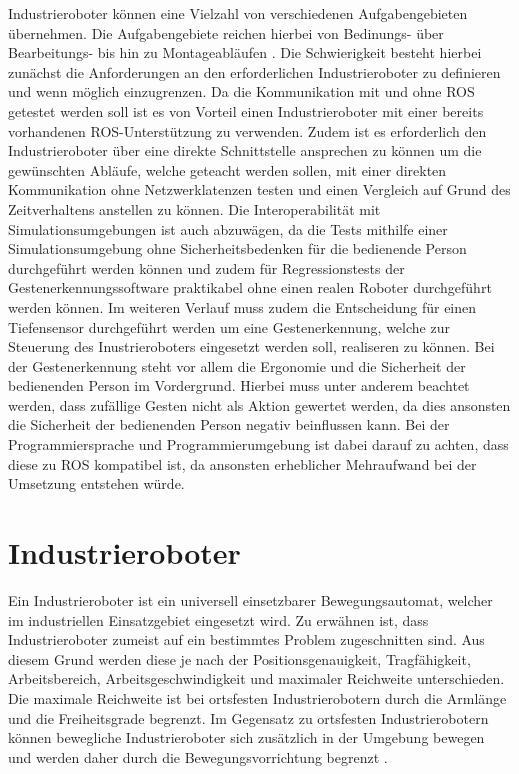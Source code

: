 
Industrieroboter können eine Vielzahl von verschiedenen Aufgabengebieten übernehmen. Die Aufgabengebiete reichen hierbei von Bedinungs- über Bearbeitungs- bis hin zu Montageabläufen \cite{noauthor_industrieroboter_2020}. Die Schwierigkeit besteht hierbei zunächst die Anforderungen an den erforderlichen Industrieroboter zu definieren und wenn möglich einzugrenzen. Da die Kommunikation mit und ohne ROS getestet werden soll ist es von Vorteil einen Industrieroboter mit einer bereits vorhandenen ROS-Unterstützung zu verwenden. Zudem ist es erforderlich den Industrieroboter über eine direkte Schnittstelle ansprechen zu können um die gewünschten Abläufe, welche geteacht werden sollen, mit einer direkten Kommunikation ohne Netzwerklatenzen testen und einen Vergleich auf Grund des Zeitverhaltens anstellen zu können. Die Interoperabilität mit Simulationsumgebungen ist auch abzuwägen, da die Tests mithilfe einer Simulationsumgebung ohne Sicherheitsbedenken für die bedienende Person durchgeführt werden können und zudem für Regressionstests der Gestenerkennungssoftware praktikabel ohne einen realen Roboter durchgeführt werden können. Im weiteren Verlauf muss zudem die Entscheidung für einen Tiefensensor durchgeführt werden um eine Gestenerkennung, welche zur Steuerung des Inustrieroboters eingesetzt werden soll, realiseren zu können. Bei der Gestenerkennung steht vor allem die Ergonomie und die Sicherheit der bedienenden Person im Vordergrund. Hierbei muss unter anderem beachtet werden, dass zufällige Gesten nicht als Aktion gewertet werden, da dies ansonsten die Sicherheit der bedienenden Person negativ beinflussen kann. Bei der Programmiersprache und Programmierumgebung ist dabei darauf zu achten, dass diese zu ROS kompatibel ist, da ansonsten erheblicher Mehraufwand bei der Umsetzung entstehen würde.

\section{Industrieroboter}
Ein Industrieroboter ist ein universell einsetzbarer Bewegungsautomat, welcher im industriellen Einsatzgebiet eingesetzt wird. Zu erwähnen ist, dass Industrieroboter zumeist auf ein bestimmtes Problem zugeschnitten sind. Aus diesem Grund werden diese je nach der Positionsgenauigkeit, Tragfähigkeit, Arbeitsbereich, Arbeitsgeschwindigkeit und maximaler Reichweite unterschieden. Die maximale Reichweite ist bei ortsfesten Industrierobotern durch die Armlänge und die Freiheitsgrade begrenzt. Im Gegensatz zu ortsfesten Industrierobotern können bewegliche Industrieroboter sich zusätzlich in der Umgebung bewegen und werden daher durch die Bewegungsvorrichtung begrenzt \cite{noauthor_industrieroboter_2020}.

